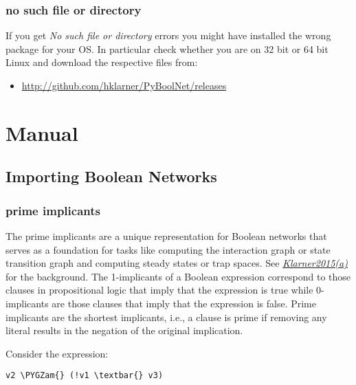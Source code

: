 \documentclass[letterpaper,10pt,english]{sphinxmanual}
\def\PYGZam{\char`\&}
\begin{document}
\subsection{no such file or directory}
\label{Installation:no-such-file-or-directory}
If you get \emph{No such file or directory} errors you might have installed the wrong package for your OS. In particular check whether you are on 32 bit or 64 bit Linux and download the respective files from:
\begin{itemize}
\item {} 
\href{http://github.com/hklarner/PyBoolNet/releases}{http://github.com/hklarner/PyBoolNet/releases}

\end{itemize}


\chapter{Manual}
\label{Manual:manual}\label{Manual:networkx-has-path}\label{Manual::doc}

\section{Importing Boolean Networks}
\label{Manual:importing-boolean-networks}

\subsection{prime implicants}
\label{Manual:prime-implicants}
The prime implicants are a unique representation for Boolean networks that serves as a foundation for tasks
like computing the interaction graph or state transition graph and computing steady states or trap spaces.
See {\hyperref[Bibliography:klarner2015trap]{\emph{Klarner2015(a)}}} for the background.
The 1-implicants of a Boolean expression correspond to those clauses in propositional logic
that imply that the expression is true while 0-implicants are those clauses that imply that the expression is false.
Prime implicants are the shortest implicants, i.e.,
a clause is prime if removing any literal results in the negation of the original implication.

Consider the expression:

\begin{Verbatim}[commandchars=\\\{\}]
v2 \PYGZam{} (!v1 \textbar{} v3)
\end{Verbatim}
\end{document}
